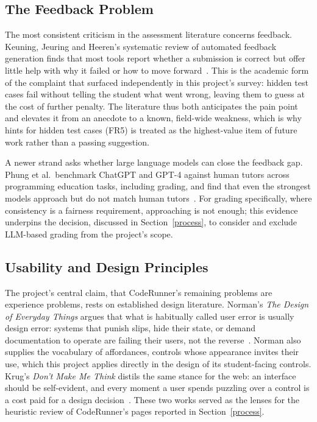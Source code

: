 \subsection{The Feedback Problem}

The most consistent criticism in the assessment literature concerns feedback. Keuning, Jeuring and Heeren's systematic review of automated feedback generation finds that most tools report whether a submission is correct but offer little help with why it failed or how to move forward~\cite{keuningfeedback}. This is the academic form of the complaint that surfaced independently in this project's survey: hidden test cases fail without telling the student what went wrong, leaving them to guess at the cost of further penalty. The literature thus both anticipates the pain point and elevates it from an anecdote to a known, field-wide weakness, which is why hints for hidden test cases (FR5) is treated as the highest-value item of future work rather than a passing suggestion.

A newer strand asks whether large language models can close the feedback gap. Phung et al.\ benchmark ChatGPT and GPT-4 against human tutors across programming education tasks, including grading, and find that even the strongest models approach but do not match human tutors~\cite{llmgrading}. For grading specifically, where consistency is a fairness requirement, approaching is not enough; this evidence underpins the decision, discussed in Section~\ref{process}, to consider and exclude LLM-based grading from the project's scope.

\subsection{Usability and Design Principles}

The project's central claim, that CodeRunner's remaining problems are experience problems, rests on established design literature. Norman's \emph{The Design of Everyday Things} argues that what is habitually called user error is usually design error: systems that punish slips, hide their state, or demand documentation to operate are failing their users, not the reverse~\cite{designofeveryday}. Norman also supplies the vocabulary of affordances, controls whose appearance invites their use, which this project applies directly in the design of its student-facing controls. Krug's \emph{Don't Make Me Think} distils the same stance for the web: an interface should be self-evident, and every moment a user spends puzzling over a control is a cost paid for a design decision~\cite{dontmakemethink}. These two works served as the lenses for the heuristic review of CodeRunner's pages reported in Section~\ref{process}.

